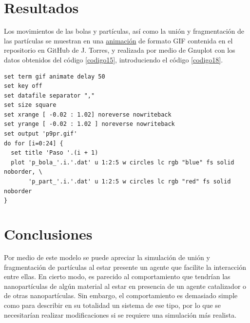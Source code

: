 \documentclass{report}
\begin{document}
\section{Resultados}
Los movimientos de las bolas y part\'iculas, as\'i como la uni\'on y fragmentaci\'on de las part\'iculas se muestran en una \href{https://github.com/FeroxDeitas/Simulacion-Nano/blob/main/Tareas/P9/Images/p9pr.gif}{animaci\'on} de formato GIF contenida en el repositorio en GitHub de J. Torres, y realizada por medio de Gnuplot con los datos obtenidos del c\'odigo \ref{codigo15}, introduciendo el c\'odigo \ref{codigo18}.

\begin{lstlisting}[caption=Animaci\'on por Medio de Gnuplot, label=codigo18, language=Gnuplot]
set term gif animate delay 50
set key off
set datafile separator ","
set size square
set xrange [ -0.02 : 1.02] noreverse nowriteback
set yrange [ -0.02 : 1.02 ] noreverse nowriteback
set output 'p9pr.gif'
do for [i=0:24] {
  set title 'Paso '.(i + 1)
  plot 'p_bola_'.i.'.dat' u 1:2:5 w circles lc rgb "blue" fs solid noborder, \
       'p_part_'.i.'.dat' u 1:2:5 w circles lc rgb "red" fs solid noborder
}
\end{lstlisting}

\section{Conclusiones}
Por medio de este modelo se puede apreciar la simulaci\'on de uni\'on y fragmentaci\'on de part\'iculas al estar presente un agente que facilite la interacci\'on entre ellas. En cierto modo, es parecido al comportamiento que tendr\'ian las nanopart\'iculas de alg\'un material al estar en presencia de un agente catalizador o de otras nanopart\'iculas. Sin embargo, el comportamiento es demasiado simple como para describir en su totalidad un sistema de ese tipo, por lo que se necesitar\'ian realizar modificaciones si se requiere una simulaci\'on m\'as realista.



\end{document}
